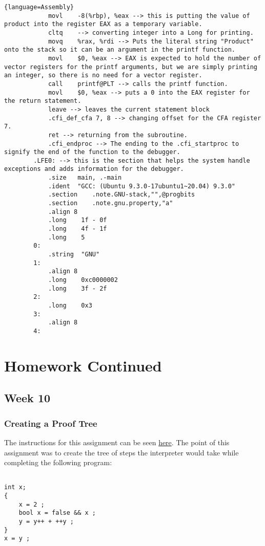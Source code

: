 \documentclass{article}
\theoremstyle{theorem}
\theoremstyle{definition}
\theoremstyle{remark}
\begin{document}
\begin{lstlisting}{language=Assembly}
        	movl	-8(%rbp), %eax --> this is putting the value of product into the register EAX as a temporary variable.
        	cltq    --> converting integer into a Long for printing.
        	movq	%rax, %rdi --> Puts the literal string "Product" onto the stack so it can be an argument in the printf function.
        	movl	$0, %eax --> EAX is expected to hold the number of vector registers for the printf arguments, but we are simply printing an integer, so there is no need for a vector register.
        	call	printf@PLT --> calls the printf function.
        	movl	$0, %eax --> puts a 0 into the EAX register for the return statement.
        	leave --> leaves the current statement block
        	.cfi_def_cfa 7, 8 --> changing offset for the CFA register 7.
        	ret --> returning from the subroutine.
        	.cfi_endproc --> The ending to the .cfi_startproc to signify the end of the function to the debugger.
        .LFE0: --> this is the section that helps the system handle exceptions and adds information for the debugger.
        	.size	main, .-main
        	.ident	"GCC: (Ubuntu 9.3.0-17ubuntu1~20.04) 9.3.0"
        	.section	.note.GNU-stack,"",@progbits
        	.section	.note.gnu.property,"a"
        	.align 8
        	.long	 1f - 0f
        	.long	 4f - 1f
        	.long	 5
        0:
        	.string	 "GNU"
        1:
        	.align 8
        	.long	 0xc0000002
        	.long	 3f - 2f
        2:
        	.long	 0x3
        3:
        	.align 8
        4:

\end{lstlisting}



\section{Homework Continued}
\subsection{Week 10}
\subsubsection{Creating a Proof Tree}
The instructions for this assignment can be seen \href{https://hackmd.io/@alexhkurz/SkZELd3X5}{here}.
The point of this assignment was to create the tree of steps the interpreter would take while completing the following program:

\begin{lstlisting}

int x;
{
    x = 2 ;
    bool x = false && x ;
    y = y++ + ++y ;
}
x = y ;

\end{lstlisting}
\end{document}
